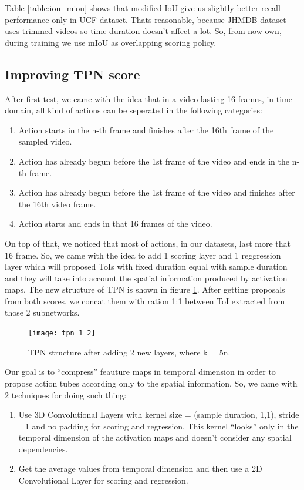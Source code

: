 Table \ref{table:iou_miou} shows that modified-IoU give us slightly better recall performance only in UCF dataset. Thats reasonable, because JHMDB dataset
uses trimmed videos so time duration doesn't affect a lot. So, from now own, during training we use mIoU as overlapping scoring policy.

\subsection{Improving TPN score}
After first test, we came with the idea that in a video lasting 16 frames, in time domain, all kind of actions can be seperated in the following categories:
\begin{enumerate}
\item Action starts in the n-th  frame and finishes after the 16th frame of the sampled video.
\item Action has already begun before the 1st frame of the video and ends in the n-th frame.
\item Action has already begun before the 1st frame of the video and finishes after the 16th video frame.
\item Action starts and ends in that 16 frames of the video.
\end{enumerate}

On top of that, we noticed that most of actions, in our datasets, last more that 16 frame. So, we came with the idea to add  1 scoring layer and 1 reggression layer
which will proposed ToIs with fixed duration equal with sample duration and they will take into account the spatial information produced by activation maps.
The new structure of TPN is shown in figure \ref{fig:tpn_1_2}. After getting proposals from both scores, we concat them with ration 1:1 between ToI extracted
from those 2 subnetworks.

\begin{figure}[h]
  \centering
  \texttt{[image: tpn\_1\_2]}
  \caption{TPN structure after adding 2 new layers, where k = 5n.}
  \label{fig:tpn_1_2}
\end{figure}
Our goal is to ``compress'' feauture maps in temporal dimension in order to propose action tubes  according only to the spatial information.
So, we came with 2 techniques for doing such thing:
\begin{enumerate}
\item Use 3D Convolutional Layers with kernel size = (sample duration, 1,1), stride =1 and no padding for scoring and regression.
  This kernel ``looks'' only in the temporal dimension of the activation maps and doesn't consider any spatial dependencies.
\item Get the average values from temporal dimension and then use a 2D Convolutional Layer for scoring and regression.
\end{enumerate}

